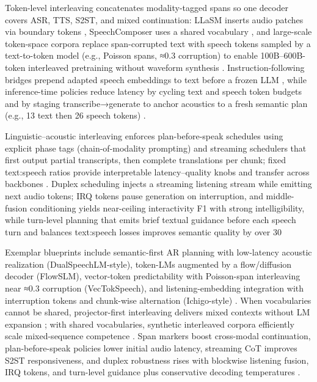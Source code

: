 \documentclass{article}
\begin{document}
Token-level interleaving concatenates modality-tagged spans so one decoder covers ASR, TTS, S2ST, and mixed continuation: LLaSM inserts audio patches via boundary tokens \cite{shu2023llasmlargelanguagespeechmodel}, SpeechComposer uses a shared vocabulary \cite{wu2024speechcomposerunifyingmultiplespeechtask}, and large-scale token-space corpora replace span-corrupted text with speech tokens sampled by a text-to-token model (e.g., Poisson spans, ≈0.3 corruption) to enable 100B–600B-token interleaved pretraining without waveform synthesis \cite{zeng2024scalingspeechtextpretrainingsyntheticint}. Instruction-following bridges prepend adapted speech embeddings to text before a frozen LLM \cite{wang2023slmbridgethingapbetweenspeechtextfoundat}, while inference-time policies reduce latency by cycling text and speech token budgets and by staging transcribe→generate to anchor acoustics to a fresh semantic plan (e.g., 13 text then 26 speech tokens) \cite{zeng2024glm4voicetowardsintelligenthumanlikeends}.

Linguistic–acoustic interleaving enforces plan-before-speak schedules using explicit phase tags (chain-of-modality prompting) and streaming schedulers that first output partial transcripts, then complete translations per chunk; fixed text:speech ratios provide interpretable latency–quality knobs and transfer across backbones \cite{zeng2024scalingspeechtextpretrainingsyntheticint,guo2025streamuniachievingstreamingspeechtransla,zeng2024glm4voicetowardsintelligenthumanlikeends}. Duplex scheduling injects a streaming listening stream while emitting next audio tokens; IRQ tokens pause generation on interruption, and middle-fusion conditioning yields near-ceiling interactivity F1 with strong intelligibility, while turn-level planning that emits brief textual guidance before each speech turn and balances text:speech losses improves semantic quality by over 30%

Exemplar blueprints include semantic-first AR planning with low-latency acoustic realization (DualSpeechLM-style), token-LMs augmented by a flow/diffusion decoder (FlowSLM), vector-token predictability with Poisson-span interleaving near ≈0.3 corruption (VecTokSpeech), and listening-embedding integration with interruption tokens and chunk-wise alternation (Ichigo-style) \cite{zeng2024scalingspeechtextpretrainingsyntheticint}. When vocabularies cannot be shared, projector-first interleaving delivers mixed contexts without LM expansion \cite{wang2023slmbridgethingapbetweenspeechtextfoundat}; with shared vocabularies, synthetic interleaved corpora efficiently scale mixed-sequence competence \cite{zeng2024scalingspeechtextpretrainingsyntheticint}. Span markers boost cross-modal continuation, plan-before-speak policies lower initial audio latency, streaming CoT improves S2ST responsiveness, and duplex robustness rises with blockwise listening fusion, IRQ tokens, and turn-level guidance plus conservative decoding temperatures \cite{zeng2024glm4voicetowardsintelligenthumanlikeends,guo2025streamuniachievingstreamingspeechtransla,ma2024languagemodelcanlistenwhilespeaking,cui2025thinkbeforeyoutalkenhancingmeaningfuldia}.

\end{document}

